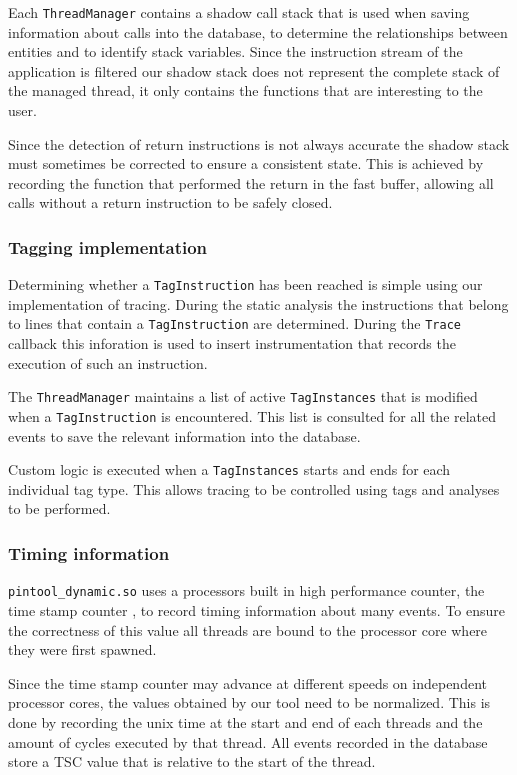 Each \texttt{ThreadManager} contains a shadow call stack that is used when saving information about calls into the database, to determine the relationships between entities and to identify stack variables. Since the instruction stream of the application is filtered our shadow stack does not represent the complete stack of the managed thread, it only contains the functions that are interesting to the user.

Since the detection of return instructions is not always accurate \cite{pindoc} the shadow stack must sometimes be corrected to ensure a consistent state. This is achieved by recording the function that performed the return in the fast buffer, allowing all calls without a return instruction to be safely closed.

\subsubsection{Tagging implementation}

Determining whether a \texttt{TagInstruction} has been reached is simple using our implementation of tracing. During the static analysis the instructions that belong to lines that contain a \texttt{TagInstruction} are determined. During the \texttt{Trace} callback this inforation is used to insert instrumentation that records the execution of such an instruction.

The \texttt{ThreadManager} maintains a list of active \texttt{TagInstances} that is modified when a \texttt{TagInstruction} is encountered. This list is consulted for all the related events to save the relevant information into the database.

Custom logic is executed when a \texttt{TagInstances} starts and ends for each individual tag type. This allows tracing to be controlled using tags and analyses to be performed.

\subsubsection{Timing information}

\texttt{pintool\_dynamic.so} uses a processors built in high performance counter, the time stamp counter \cite{tsc}, to record timing information about many events. To ensure the correctness of this value all threads are bound to the processor core where they were first spawned.

Since the time stamp counter may advance at different speeds on independent processor cores, the values obtained by our tool need to be normalized. This is done by recording the unix time at the start and end of each threads and the amount of cycles executed by that thread. All events recorded in the database store a TSC value that is relative to the start of the thread.


